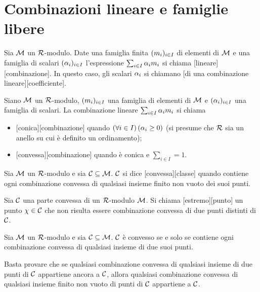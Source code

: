 \section{Combinazioni lineare e famiglie libere}\label{CombinazioniLineariEFamiglieLibere}
\begin{Definition}
	Sia $\mathcal{M}$ un $\mathcal{R}$-modulo. Date una famiglia finita
	$(m_i)_{i \in I}$ di elementi di $\mathcal{M}$ e una
	famiglia di scalari $(\alpha_i)_{i \in I}$ l'espressione
	$\sum_{i \in I} \alpha_i m_i$ si chiama
	[lineare][combinazione]. In questo
	caso, gli scalari $\alpha_i$ si chiamano
	[di una combinazione lineare][coefficiente].
\end{Definition}
\begin{Definition}
	Siano $\mathcal{M}$ un $\mathcal{R}$-modulo, $(m_i)_{i \in I}$ una famiglia di elementi di $\mathcal{M}$ e $(\alpha_i)_{i \in I}$ una famiglia di scalari. La combinazione lineare $\sum_{i \in I} \alpha_i m_i$ si chiama
	\begin{itemize}
		\item {}[conica][combinazione] quando $\left ( \forall i \in I \right ) \left ( \alpha_i \geq 0 \right )$ (si presume che $\mathcal{R}$ sia un anello su cui \`e definito un ordinamento);
		\item {}[convessa][combinazione] quando \`e conica e $\sum_{i \in I} = 1$.
	\end{itemize}
\end{Definition}
\begin{Definition}
	Sia $\mathcal{M}$ un $\mathcal{R}$-modulo e sia $\mathcal{C} \subseteq \mathcal{M}$. $\mathcal{C}$ si dice [convessa][classe] quando contiene ogni combinazione convessa di qualsiasi insieme finito non vuoto dei suoi punti.
\end{Definition}
\begin{Definition}
	Sia $\mathcal{C}$ una parte convessa di un $\mathcal{R}$-modulo $\mathcal{M}$. Si chiama [estremo][punto] un punto $\chi \in \mathcal{C}$ che non risulta essere combinazione convessa di due punti distinti di $\mathcal{C}$.
\end{Definition}
\begin{Theorem}
	Sia $\mathcal{M}$ un $\mathcal{R}$-modulo e sia $\mathcal{C} \subseteq \mathcal{M}$. $\mathcal{C}$ \`e convesso se e solo se contiene ogni combinazione convessa di qualsiasi insieme di due suoi punti.
\end{Theorem}
\Proof Basta provare che se qualsiasi combinazione convessa di qualsiasi insieme di due punti di $\mathcal{C}$ appartiene ancora a $\mathcal{C}$, allora qualsiasi combinazione convessa di qualsiasi insieme finito non vuoto di punti di $\mathcal{C}$ appartiene a $\mathcal{C}$.
